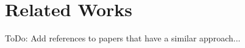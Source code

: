 \section{Related Works} %
\label{sec:related_works}

\colorbox{yellow!30}{ToDo:} Add references to papers that have a similar approach...